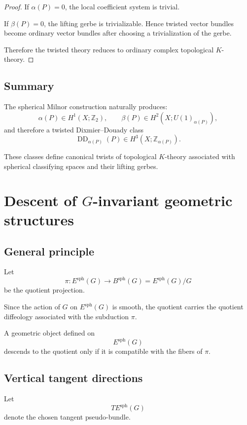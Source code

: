 \documentclass[11pt]{amsart}
\begin{document}
\begin{proof}
If \(\alpha(P)=0\), the local coefficient system is trivial.

If \(\beta(P)=0\), the lifting gerbe is trivializable. Hence twisted vector
bundles become ordinary vector bundles after choosing a trivialization of the
gerbe.

Therefore the twisted theory reduces to ordinary complex topological
\(K\)-theory.
\end{proof}

\subsection{Summary}

The spherical Milnor construction naturally produces:
\[
\alpha(P)\in H^1(X;\mathbb Z_2),
\qquad
\beta(P)\in H^2(X;U(1)_{\alpha(P)}),
\]
and therefore a twisted Dixmier--Douady class
\[
\operatorname{DD}_{\alpha(P)}(P)
\in
H^3(X;\mathbb Z_{\alpha(P)}).
\]

These classes define canonical twists of topological \(K\)-theory associated
with spherical classifying spaces and their lifting gerbes.


\section{Descent of \(G\)-invariant geometric structures}
\label{sec:descent}

\subsection{General principle}

Let
\[
\pi:
E^{\mathrm{sph}}(G)
\longrightarrow
B^{\mathrm{sph}}(G)
=
E^{\mathrm{sph}}(G)/G
\]
be the quotient projection.

Since the action of \(G\) on \(E^{\mathrm{sph}}(G)\) is smooth, the quotient
carries the quotient diffeology associated with the subduction \(\pi\).

A geometric object defined on
\[
E^{\mathrm{sph}}(G)
\]
descends to the quotient only if it is compatible with the fibers of \(\pi\).

\subsection{Vertical tangent directions}

Let
\[
T E^{\mathrm{sph}}(G)
\]
denote the chosen tangent pseudo-bundle.
\end{document}
